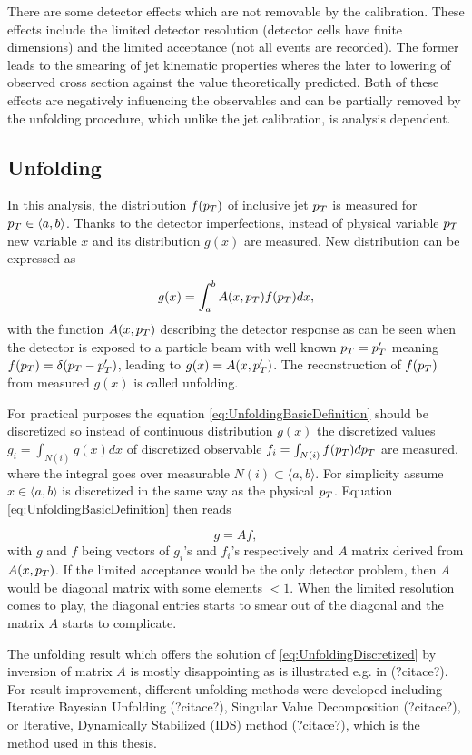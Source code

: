 There are some detector effects which are not removable by the calibration. These
effects include the limited detector resolution (detector cells have finite
dimensions) and the limited acceptance (not all events are recorded). The former
leads to the smearing of jet kinematic properties wheres the later to
lowering of observed cross section against the value theoretically
predicted. Both of these effects are negatively influencing the observables
and can be partially removed by the unfolding procedure, which unlike
the jet calibration, is analysis dependent. 

\subsection{Unfolding}

In this analysis, the distribution $f(p_{T})$ of inclusive jet $p_{T}$ is measured
for $p_{T} \in \langle a, b \rangle$. Thanks to the detector imperfections,
instead of physical variable $p_{T}$ new variable $x$ and its distribution
$g(x)$ are measured. New distribution can be expressed as

\begin{equation}
  g(x) = \int_a^b A(x, p_{T}) f(p_{T}) dx,
  \label{eq:UnfoldingBasicDefinition}
\end{equation}
with the function $A(x, p_{T})$ describing the detector response as can be seen
when the detector is exposed to a particle beam with well known $p_{T} = p_{T}'$
meaning $f(p_{T}) = \delta(p_{T} - p_{T}')$, leading to $g(x) = A(x, p_{T}')$. The
reconstruction of $f(p_{T})$ from measured $g(x)$ is called unfolding.

For practical purposes the equation \eqref{eq:UnfoldingBasicDefinition} should
be discretized so instead of continuous distribution $g(x)$ the discretized
values $g_i = \int_{N(i)} g(x)dx$ of discretized observable $f_i =
\int_{N(i)} f(p_{T})dp_{T}$ are measured, where the integral goes over measurable $N(i)
\subset \langle a, b \rangle$. For simplicity assume $x \in \langle
a, b \rangle$ is discretized in the same way as the physical $p_{T}$. Equation 
\eqref{eq:UnfoldingBasicDefinition} then reads

\begin{equation}
  g = Af,
  \label{eq:UnfoldingDiscretized}
\end{equation}
with $g$ and $f$ being vectors of $g_i$'s and $f_i$'s respectively and $A$ matrix
derived from $A(x, p_{T})$. If the limited acceptance would be the only detector
problem, then $A$ would be diagonal matrix with some elements $ < 1$. When the
limited resolution comes to play, the diagonal entries starts to smear out of
the diagonal and the matrix $A$ starts to complicate.

The unfolding result which offers the solution of
\eqref{eq:UnfoldingDiscretized} by inversion of matrix $A$ is mostly
disappointing as is illustrated e.g. in (?citace?). For result improvement,
different unfolding methods were developed including Iterative Bayesian
Unfolding (?citace?), Singular Value Decomposition (?citace?), or Iterative,
Dynamically Stabilized (IDS) method (?citace?), which is the method used in this
thesis. 


